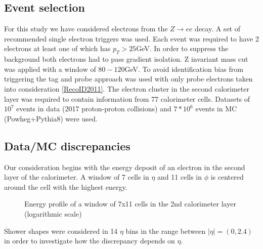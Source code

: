 \subsection{Event selection}
For this study we have considered electrons from the $Z\rightarrow ee$ decay. A set of recommended single electron triggers was used. Each event was required to have 2 electrons at least one of which has $p_T>25$GeV.  In order to suppress the background both electrons had to pass gradient isolation. Z invariant mass cut was applied with a window of $80-120$GeV. To avoid identification bias from triggering the tag and probe approach was used with only probe electrons taken into consideration \ref{RecoID2011}. The electron cluster in the second calorimeter layer was required to contain information from 77 calorimeter cells. Datasets of $10^7$ events in data (2017 proton-proton collisions) and $7*10^6$ events in MC (Powheg+Pythia8) were used.
\subsection{Data/MC discrepancies}
Our consideration begins with the energy deposit of an electron in the second layer of the calorimeter. A window of 7 cells in $\eta$ and 11 cells in $\phi$ is centered around the cell with the highest energy.
\begin{figure}[htbp]
\caption{Energy profile of a window of 7x11 cells in the 2nd calorimeter layer (logarithmic scale) }
\label{2dprofile}
\end{figure}
Shower shapes were considered in 14 $\eta$ bins in the range between $|\eta| = (0,2.4)$ in order to investigate how the discrepancy depends on $\eta$. 

